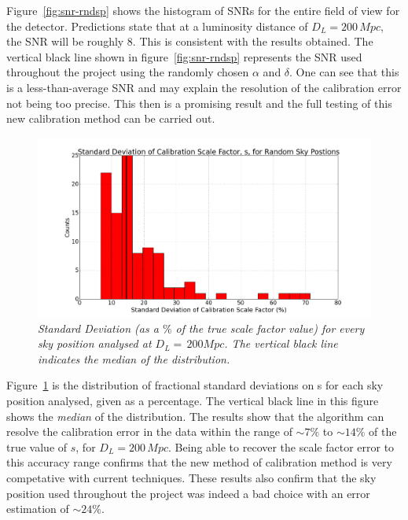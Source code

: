\documentclass{jpconf}
\begin{document}
Figure~\ref{fig:snr-rndsp} shows the histogram of SNRs for the entire field of view for the detector. Predictions state that at a luminosity distance of $D_{L}=200\,Mpc$, the SNR will be roughly 8. This is consistent with the results obtained. The vertical black line shown in figure~\ref{fig:snr-rndsp} represents the SNR used throughout the project using the randomly chosen $\alpha$ and $\delta$. One can see that this is a less-than-average SNR and may explain the resolution of the calibration error not being too precise. This then is a promising result and the full testing of this new calibration method can be carried out. 


\begin{figure}[h]
  \centering
  \includegraphics[width=\textwidth]{rand_sp_std_D200}
  \caption{\textit{Standard Deviation (as a $\%$ of the true scale factor value) for every sky position analysed at $D_{L}=\,200Mpc$. The vertical black line indicates the median of the distribution.}}
  \label{fig:std-rndsp}
\end{figure}



Figure~\ref{fig:std-rndsp} is the distribution of fractional standard deviations on s for each sky position analysed, given as a percentage. The vertical black line in this figure shows the \textit{median} of the distribution. The results show that the algorithm can resolve the calibration error in the data within the range of $\sim 7\%$ to $\sim 14\%$ of the true value of $s$, for $D_{L}=200\,Mpc$. Being able to recover the scale factor error to this accuracy range confirms that the new method of calibration method is very competative with current techniques. These results also confirm that the sky position used throughout the project was indeed a bad choice with an error estimation of $\sim 24\%$.
\end{document}
